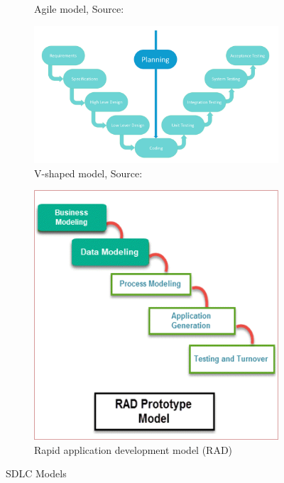 \begin{figure}[htbp]
\begin{subfigure}[b]{0.45\textwidth}
		\caption{Agile model, Source: \citet{Team:2017}}
		\label{fig: 5}
	\end{subfigure}
	\hfill
	\begin{subfigure}[b]{0.45\textwidth}
		\centering
		\includegraphics[width=\linewidth]{./V-Shaped}
		\caption{V-shaped model, Source: \citet{Team:2017}}
		\label{fig: 6}
	\end{subfigure}
	\medskip
	\begin{subfigure}[b]{0.5\textwidth}
		\centering
		\includegraphics[width=\linewidth]{./rad}
		\caption{Rapid application development model (RAD)}
		\label{fig: 7}
	\end{subfigure}
\caption{\ac{SDLC} Models}
\end{figure}
